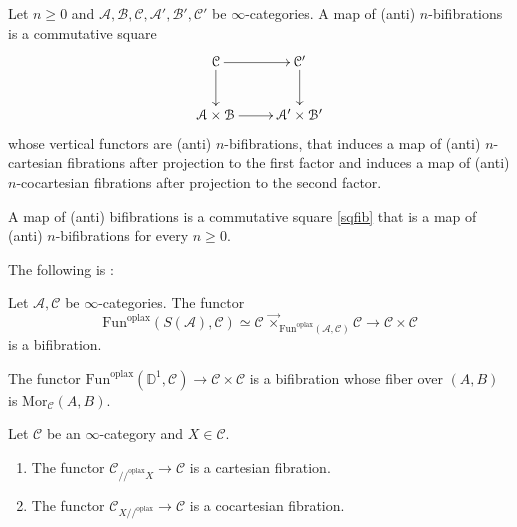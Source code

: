 \documentclass[10pt,oneside]{article}
\numberwithin{equation}{section} %
\numberwithin{figure}{section} %
\theoremstyle{plain}
\theoremstyle{definition}
\newcommand{\bD}{{\mathbb D}}
\newcommand{\mA}{{\mathcal A}}
\newcommand{\mB}{{\mathcal B}}
\newcommand{\mC}{{\mathcal C}}
\newcommand{\Fun}{\mathrm{Fun}}
\newcommand{\oplax}{{\mathrm{oplax}}}
\newcommand{\Mor}{{\mathrm{Mor}}}
\begin{document}
\begin{definition}
Let $ n \geq 0 $ and $\mA,\mB,\mC, \mA',\mB',\mC'$ be $\infty$-categories.
A map of (anti) $n$-bifibrations is a commutative square
\begin{equation}\label{sqfib}
\xymatrix{
\mC \ar[r] \ar[d] & \mC' \ar[d] \\
\mA \times \mB \ar[r] & \mA' \times \mB'
}
\end{equation}
whose vertical functors are (anti) $n$-bifibrations,
that induces a map of (anti) $n$-cartesian fibrations after projection to the first factor and induces a map of (anti) $n$-cocartesian fibrations after projection to the second factor.

A map of (anti) bifibrations is a commutative square
\ref{sqfib} that is a map of (anti) $n$-bifibrations for every $n \geq 0.$

\end{definition}



The following is \cite[Corollary 4.1.7.]{gepner2026fibrations}:



\begin{corollary}\label{targetfibr}
Let $\mA, \mC$ be $\infty$-categories.
The functor $$\Fun^\oplax(S(\mA),\mC) \simeq \mC \,{{\vec{\times}}}_{\Fun^\oplax(\mA,\mC)} \mC \to \mC \times \mC $$
is a bifibration.
\end{corollary}

\begin{corollary}\label{targetfi2}
The functor $\Fun^{\oplax}(\bD^1,\mC)\to\mC\times\mC$ is a bifibration whose fiber over $(A,B)$ is $\Mor_\mC(A,B)$.
\end{corollary}


\begin{corollary}\label{slicecocart}
Let $\mC$ be an $\infty$-category and $X \in \mC.$



\begin{enumerate}[\normalfont(1)]\setlength{\itemsep}{-2pt}
\item The functor $ \mC_{//^\oplax X}\to \mC$ is a cartesian fibration. 

\item The functor $ \mC_{X //^\oplax}\to \mC$ is a cocartesian fibration.



\end{enumerate}
\end{corollary}
\end{document}
